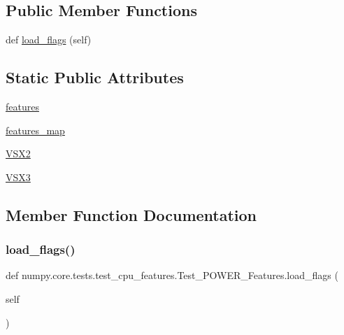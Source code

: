 \subsection*{Public Member Functions}
\begin{DoxyCompactItemize}
\item 
def \hyperlink{classnumpy_1_1core_1_1tests_1_1test__cpu__features_1_1Test__POWER__Features_a7feae66d5e21a5f12e6ca50371b05e3e}{load\+\_\+flags} (self)
\end{DoxyCompactItemize}
\subsection*{Static Public Attributes}
\begin{DoxyCompactItemize}
\item 
\hyperlink{classnumpy_1_1core_1_1tests_1_1test__cpu__features_1_1Test__POWER__Features_ac7c26bf0733de0e63217dd6a84e36c7d}{features}
\item 
\hyperlink{classnumpy_1_1core_1_1tests_1_1test__cpu__features_1_1Test__POWER__Features_ac5faecc83bcb6301ea412374dbfcf9e3}{features\+\_\+map}
\item 
\hyperlink{classnumpy_1_1core_1_1tests_1_1test__cpu__features_1_1Test__POWER__Features_ad0ac6f9977b81ce7829d43ad4b1f20de}{V\+S\+X2}
\item 
\hyperlink{classnumpy_1_1core_1_1tests_1_1test__cpu__features_1_1Test__POWER__Features_a713f91f9588656ba680d37d588f3c18f}{V\+S\+X3}
\end{DoxyCompactItemize}


\subsection{Member Function Documentation}
\mbox{\label{classnumpy_1_1core_1_1tests_1_1test__cpu__features_1_1Test__POWER__Features_a7feae66d5e21a5f12e6ca50371b05e3e}} 
\subsubsection{\texorpdfstring{load\+\_\+flags()}{load\_flags()}}
{\footnotesize\ttfamily def numpy.\+core.\+tests.\+test\+\_\+cpu\+\_\+features.\+Test\+\_\+\+P\+O\+W\+E\+R\+\_\+\+Features.\+load\+\_\+flags (\begin{DoxyParamCaption}\item[{}]{self }\end{DoxyParamCaption})}



